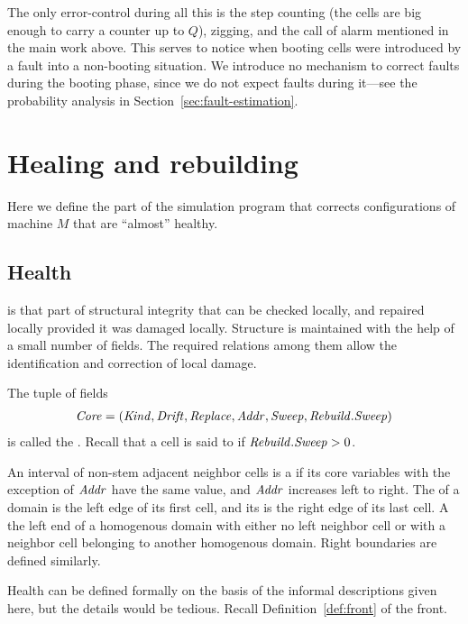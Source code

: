 \documentclass[11pt]{memoir}
\theoremstyle{definition} %
\newcommand{\fld}[1]{\ensuremath{\textit{#1\/}}}
\newcommand{\Q}{Q} %
\newcommand{\Addr}{\fld{Addr}}
\newcommand{\Core}{\fld{Core}}
\newcommand{\Drift}{\fld{Drift}}
\newcommand{\Kind}{\fld{Kind}}
\newcommand{\Rebuild}{\fld{Rebuild}} %
\newcommand{\Replace}{\fld{Replace}}
\newcommand{\Sweep}{\fld{Sweep}} %
\begin{document}
The only error-control during all this is the step counting (the cells are big enough
to carry a counter up to \( \Q \)), zigging, and the call of alarm mentioned in the main work above.
This serves to notice when booting cells were introduced by a fault
into a non-booting situation.
We introduce no mechanism to correct faults during the booting phase, since
we do not expect faults
during it---see the probability analysis in Section~\ref{sec:fault-estimation}.


\section{Healing and rebuilding}\label{sec:healing}

Here we define the part of the simulation program that
corrects configurations of machine \( M \) that are ``almost'' healthy.

\subsection{Health}            \label{sec:health}

 is that part of structural integrity that can be checked locally,
and repaired locally provided it was damaged locally.
Structure is maintained with the help of a small number of fields.
The required relations among them 
allow the identification and correction of local damage.

\begin{definition}\label{def:domains}
The tuple of fields
\begin{align*}
   \Core =(\Kind,\Drift,\Replace,\Addr,\Sweep,\Rebuild.\Sweep)
 \end{align*}
 is called the .
 Recall that a cell is said to  if \( \Rebuild.\Sweep>0 \).

 An interval of non-stem adjacent neighbor cells is a  if
 its core variables with the exception of \( \Addr \) have the same value, and
 \( \Addr \) increases left to right.
The  of a domain is the left edge of its first cell, and its  is 
the right edge of its last cell.
A  the left end of a homogenous domain with either no left neighbor cell
or with a neighbor cell belonging to another homogenous domain.
Right boundaries are defined similarly.
\end{definition}

Health can be defined formally on the basis of the informal descriptions given here,
but the details would be tedious.
Recall Definition~\ref{def:front} of the front.
\end{document}
